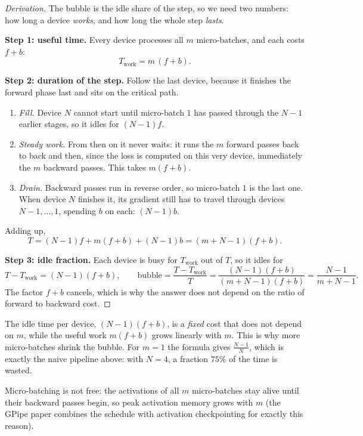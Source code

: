 \documentclass[11pt,a4paper]{article}
\theoremstyle{definition}
\theoremstyle{remark}
\theoremstyle{plain}
\begin{document}
\begin{proof}[Derivation]
The bubble is the idle share of the step, so we need two numbers: how long
a device \emph{works}, and how long the whole step \emph{lasts}.

\smallskip
\noindent\textbf{Step 1: useful time.} Every device processes all $m$
micro-batches, and each costs $f+b$:
\[
  T_{\mathrm{work}} = m\,(f+b).
\]

\noindent\textbf{Step 2: duration of the step.} Follow the last device,
because it finishes the forward phase last and sits on the critical path.
\begin{enumerate}[label=(\alph*), leftmargin=1.8em, itemsep=2pt]
    \item \emph{Fill.} Device $N$ cannot start until micro-batch $1$ has
    passed through the $N-1$ earlier stages, so it idles for $(N-1)f$.
    \item \emph{Steady work.} From then on it never waits: it runs the $m$
    forward passes back to back and then, since the loss is computed on
    this very device, immediately the $m$ backward passes. This takes
    $m(f+b)$.
    \item \emph{Drain.} Backward passes run in reverse order, so
    micro-batch $1$ is the last one. When device $N$ finishes it, its
    gradient still has to travel through devices $N-1,\ldots,1$, spending
    $b$ on each: $(N-1)b$.
\end{enumerate}
Adding up,
\[
  T = (N-1)f + m(f+b) + (N-1)b = (m+N-1)(f+b).
\]

\noindent\textbf{Step 3: idle fraction.} Each device is busy for
$T_{\mathrm{work}}$ out of $T$, so it idles for
\[
  T - T_{\mathrm{work}} = (N-1)(f+b),
  \qquad
  \mathrm{bubble} = \frac{T - T_{\mathrm{work}}}{T}
  = \frac{(N-1)(f+b)}{(m+N-1)(f+b)} = \frac{N-1}{m+N-1}.
\]
The factor $f+b$ cancels, which is why the answer does not depend on the
ratio of forward to backward cost.
\end{proof}

The idle time per device, $(N-1)(f+b)$, is a \emph{fixed} cost that does not
depend on $m$, while the useful work $m(f+b)$ grows linearly with $m$. This
is why more micro-batches shrink the bubble. For $m=1$ the formula gives
$\tfrac{N-1}{N}$, which is exactly the naive pipeline above: with $N=4$, a
fraction $75\%$ of the time is wasted.

Micro-batching is not free: the activations of all $m$ micro-batches stay
alive until their backward passes begin, so peak activation memory grows
with $m$ (the GPipe paper combines the schedule with activation
checkpointing for exactly this reason).
\end{document}
